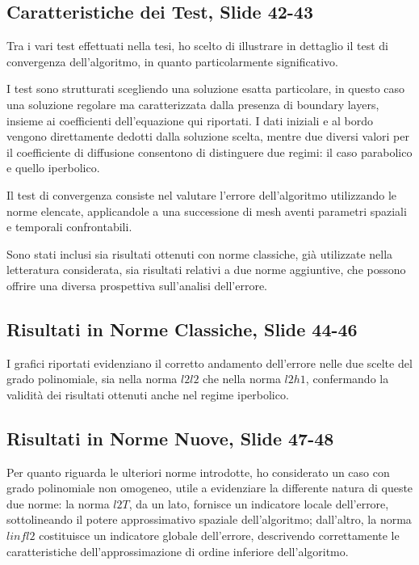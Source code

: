 \documentclass[12pt]{article}
\begin{document}
    \subsection{Caratteristiche dei Test, Slide 42-43}

    Tra i vari test effettuati nella tesi, ho scelto di illustrare in dettaglio il test di convergenza dell'algoritmo, in quanto particolarmente significativo.

    I test sono strutturati scegliendo una soluzione esatta particolare, in questo caso una soluzione regolare ma caratterizzata dalla presenza di boundary layers, insieme ai coefficienti dell'equazione qui riportati. I dati iniziali e al bordo vengono direttamente dedotti dalla soluzione scelta, mentre due diversi valori per il coefficiente di diffusione consentono di distinguere due regimi: il caso parabolico e quello iperbolico.

    Il test di convergenza consiste nel valutare l'errore dell'algoritmo utilizzando le norme elencate, applicandole a una successione di mesh aventi parametri spaziali e temporali confrontabili.

    Sono stati inclusi sia risultati ottenuti con norme classiche, già utilizzate nella letteratura considerata, sia risultati relativi a due norme aggiuntive, che possono offrire una diversa prospettiva sull'analisi dell'errore.

    \subsection{Risultati in Norme Classiche, Slide 44-46}

    I grafici riportati evidenziano il corretto andamento dell'errore nelle due scelte del grado polinomiale, sia nella norma $l2l2$ che nella norma $l2h1$, confermando la validità dei risultati ottenuti anche nel regime iperbolico.

    \subsection{Risultati in Norme Nuove, Slide 47-48}

    Per quanto riguarda le ulteriori norme introdotte, ho considerato un caso con grado polinomiale non omogeneo, utile a evidenziare la differente natura di queste due norme: la norma $l2T$, da un lato, fornisce un indicatore locale dell'errore, sottolineando il potere approssimativo spaziale dell'algoritmo; dall'altro, la norma $linfl2$ costituisce un indicatore globale dell'errore, descrivendo correttamente le caratteristiche dell'approssimazione di ordine inferiore dell'algoritmo.
\end{document}
